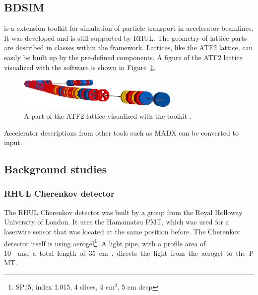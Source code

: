 \subsection{BDSIM}
\label{BDSIM}
\bdsim is a \geant extension toolkit for simulation of particle transport in accelerator beamlines. It was developed and is still supported by RHUL.
The geometry of lattice parts are described in classes within the \bdsim framework. Lattices, like the ATF2 lattice, can easily be built up by the pre-defined components. A figure of the ATF2 lattice visualized with the \bdsim software is shown in Figure~\ref{fig:ATF2_BDSIM}.
\begin{figure}
\centering
\includegraphics[width=0.7\textwidth]{Figures/atf_bdsim.png} %
\caption[ATF2 lattice in \bdsim]{A part of the ATF2 lattice visualized with the \geant toolkit \bdsim.}
\label{fig:ATF2_BDSIM}
\end{figure}
Accelerator descriptions from other tools such as MADX can be converted to \bdsim input. 
\subsection{Background studies}
\subsubsection{RHUL Cherenkov detector}
\label{RHUL}

The RHUL Cherenkov detector was built by a group from the Royal Holloway University of London. It uses the Hamamatsu PMT, which was used for a laserwire sensor that was located at the same position before. The Cherenkov detector itself is using aerogel\footnote{SP15, index 1.015, 4 slices, 4 cm$^2$, 5 cm deep}. A light pipe, with a profile area of \SI{10}{\centi\metre\square} and a total length of \SI{35}{\centi\metre}, directs the light from the aerogel to the PMT.

